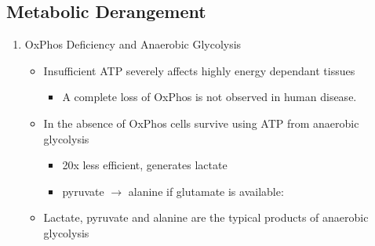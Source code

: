 \documentclass{scrartcl}
\begin{document}
\subsection{Metabolic Derangement}
\label{sec:org2eaf2f4}
\begin{enumerate}
\item OxPhos Deficiency and Anaerobic Glycolysis
\label{sec:orgbd4bd2d}
\begin{itemize}
\item Insufficient ATP severely affects highly energy dependant tissues
\begin{itemize}
\item A complete loss of OxPhos is not observed in human disease.
\end{itemize}
\item In the absence of OxPhos cells survive using ATP from anaerobic glycolysis
\begin{itemize}
\item 20x less efficient, generates lactate
\item pyruvate \(\to\) alanine if glutamate is available:
\end{itemize}
\item Lactate, pyruvate and alanine are the typical products of anaerobic glycolysis
\end{itemize}


\end{enumerate}
\end{document}
